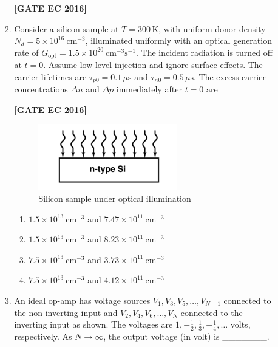 \documentclass[12pt]{article}
\begin{document}
\begin{enumerate}[label=\textbf{Q.\arabic*.}, start=6, itemsep=2em]
\begin{enumerate}[label=\textbf{Q.\arabic*.}, start=26]
\begin{enumerate}[label=\textbf{Q.\arabic*.}, start=31]
\noindent \textbf{[GATE EC 2016]}

\item Consider a silicon sample at $T = 300\,$K, with uniform donor density $N_d = 5\times 10^{16}\ \text{cm}^{-3}$, illuminated uniformly with an optical generation rate of $G_{\text{opt}} = 1.5\times 10^{20}\ \text{cm}^{-3}\text{s}^{-1}$. The incident radiation is turned off at $t=0$. Assume low-level injection and ignore surface effects. The carrier lifetimes are $\tau_{p0} = 0.1\,\mu\text{s}$ and $\tau_{n0} = 0.5\,\mu\text{s}$. The excess carrier concentrations $\Delta n$ and $\Delta p$ immediately after $t=0$ are

\noindent \textbf{[GATE EC 2016]}

\begin{figure}[H]\centering
\includegraphics[width=0.55\columnwidth]{figs/q39.png}
\caption{Silicon sample under optical illumination}
\label{fig:q39}
\end{figure}

\begin{multicols}{2}
    \begin{enumerate}
        \item $1.5\times 10^{13}\ \text{cm}^{-3}$ and $7.47\times 10^{11}\ \text{cm}^{-3}$
        \item $1.5\times 10^{13}\ \text{cm}^{-3}$ and $8.23\times 10^{11}\ \text{cm}^{-3}$
        \item $7.5\times 10^{13}\ \text{cm}^{-3}$ and $3.73\times 10^{11}\ \text{cm}^{-3}$
        \item $7.5\times 10^{13}\ \text{cm}^{-3}$ and $4.12\times 10^{11}\ \text{cm}^{-3}$
    \end{enumerate}
\end{multicols}

\item An ideal op-amp has voltage sources $V_1, V_3, V_5,\dots, V_{N-1}$ connected to the non-inverting input and $V_2, V_4, V_6,\dots, V_N$ connected to the inverting input as shown. The voltages are $1, -\tfrac{1}{2}, \tfrac{1}{3}, -\tfrac{1}{4}, \dots$ volts, respectively. As $N \to \infty$, the output voltage (in volt) is \_\_\_\_\_\_\_.


\end{enumerate}
\end{enumerate}
\end{enumerate}
\end{document}
